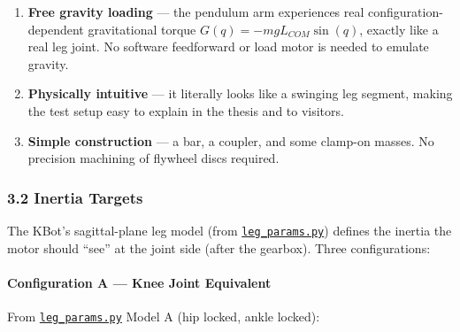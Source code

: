 \documentclass[
]{article}
\providecommand{\tightlist}{%
  \setlength{\itemsep}{0pt}\setlength{\parskip}{0pt}}
\begin{document}
\begin{enumerate}
\def\labelenumi{\arabic{enumi}.}
\tightlist
\item
  \textbf{Free gravity loading} --- the pendulum arm experiences real
  configuration-dependent gravitational torque
  \(G(q) = -m g L_{COM} \sin(q)\), exactly like a real leg joint. No
  software feedforward or load motor is needed to emulate gravity.
\item
  \textbf{Physically intuitive} --- it literally looks like a swinging
  leg segment, making the test setup easy to explain in the thesis and
  to visitors.
\item
  \textbf{Simple construction} --- a bar, a coupler, and some clamp-on
  masses. No precision machining of flywheel discs required.
\end{enumerate}

\subsubsection{3.2 Inertia Targets}\label{inertia-targets}

The KBot's sagittal-plane leg model (from
\href{../../MuJoCo/kbot/leg_params.py}{\texttt{leg\_params.py}}) defines
the inertia the motor should ``see'' at the joint side (after the
gearbox). Three configurations:

\paragraph{Configuration A --- Knee Joint
Equivalent}\label{configuration-a-knee-joint-equivalent}

From \href{../../MuJoCo/kbot/leg_params.py}{\texttt{leg\_params.py}}
Model A (hip locked, ankle locked):
\end{document}

